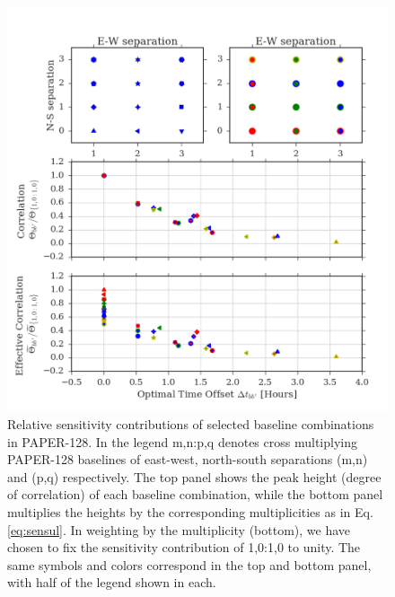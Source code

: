 \documentclass[twocolumn,apj,numberedappendix]{emulateapj}
\renewcommand\[{\begin{equation}}
\renewcommand\]{\end{equation}}
\begin{document}
\begin{figure}[h!]
\includegraphics[width=\textwidth]{sensitivity_1}

\caption{Relative sensitivity contributions of selected baseline combinations in PAPER-128. In the legend m,n:p,q denotes cross
multiplying PAPER-128 baselines of east-west, north-south separations (m,n) and (p,q) respectively. The top
panel shows the peak height (degree of correlation) of each baseline
combination, while the bottom panel multiplies the heights by the
corresponding multiplicities as in Eq. \eqref{eq:sensul}. 
In weighting by the multiplicity (bottom), we have chosen to fix the sensitivity 
contribution of 1,0:1,0 to unity. The same symbols and colors correspond in the top and bottom panel, with half of the legend shown in each. }
\label{fig:sensplot}
\end{figure}
\end{document}
